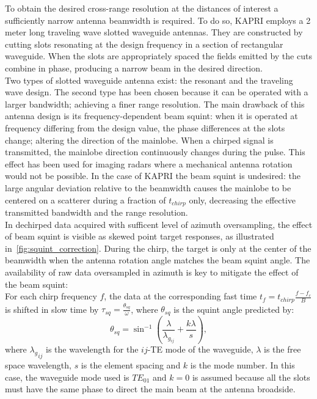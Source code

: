  To obtain the desired cross-range resolution at the distances of interest a sufficiently narrow antenna beamwidth is required. To do so, KAPRI employs a 2 meter long traveling wave slotted waveguide antennas\cite{Hines1953a,Granet2007}. They are constructed by cutting slots resonating at the design frequency in a section of rectangular waveguide. When the slots are appropriately spaced the fields emitted by the cuts combine in phase, producing a narrow beam in the desired direction.\\ Two types of slotted waveguide antenna exist\cite{Enjiu2013}: the resonant and the traveling wave design. The second type has been chosen because it can be operated with a larger bandwidth; achieving a finer range resolution. The main drawback of this antenna design is its frequency-dependent beam squint: when it is operated at frequency differing from the design value, the phase differences at the slots change; altering the direction of the mainlobe. When a chirped signal is transmitted, the mainlobe direction continuously changes during the pulse. This effect has been used for imaging radars where a mechanical antenna rotation would not be possible\cite{Yang2014,Yang2012,Mayer2003,Alvarez2013}. In the case of KAPRI the beam squint is undesired: the large angular deviation relative to the beamwidth causes the mainlobe to be centered on a scatterer during a fraction of $t_{chirp}$ only, decreasing the effective transmitted bandwidth and the range resolution.\\ 
In dechirped data acquired with sufficent level of azimuth oversampling, the effect of beam squint is visible as skewed point target responses, as illustrated in~\autoref{fig:squint_correction}. During the chirp, the target is only at the center of the beamwidth when the antenna rotation angle matches the beam squint angle. 
The availability of raw data oversampled in azimuth is key to mitigate the effect of the beam squint:\\ For each chirp frequency $f$, the data at the corresponding fast time $t_{f} = t_{chirp}\frac{f - f_c}{B}$  is shifted in slow time by $\tau_{sq}=\frac{\theta_{sq}}{\omega}$, where $\theta_{sq}$ is the squint angle predicted by:
\begin{equation}\label{eq:squint_exact}
	\theta_{sq} = \sin^{-1}\left(\frac{\lambda}{\lambda_{g_{ij}}} + \frac{k \lambda}{s}\right),
\end{equation}
where ${\lambda_g}_{ij}$ is the wavelength for the $ij$-TE mode of the waveguide, $\lambda$ is the free space wavelength, $s$ is the element spacing and $k$ is the mode number. In this case, the waveguide mode used is $TE_{01}$ and $k=0$ is assumed because all the slots must have the same phase\cite{kraus88} to direct the main beam at the antenna broadside.\\
